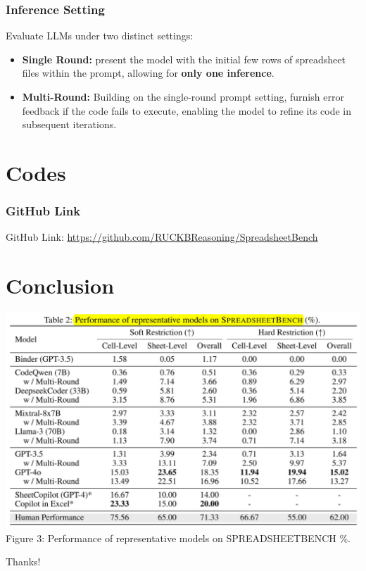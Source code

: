 \documentclass{beamer}
\begin{document}
\begin{frame}
    \frametitle{Inference Setting}
    Evaluate LLMs under two distinct settings:
    \begin{itemize}
        \item \textbf{Single Round:} present the model with the initial few rows of spreadsheet files within the prompt, allowing for \textbf{only one inference}.
        \item \textbf{Multi-Round:} Building on the single-round prompt setting, furnish error feedback if the code fails to execute, enabling the model to refine its code in subsequent iterations.
    \end{itemize}
\end{frame}

\section{Codes}
\begin{frame}
    \frametitle{GitHub Link}
    GitHub Link: \href{https://github.com/RUCKBReasoning/SpreadsheetBench}{https://github.com/RUCKBReasoning/SpreadsheetBench}
\end{frame}

\section{Conclusion}
\begin{frame}
    \centering
    \includegraphics[width=1\linewidth]{pic/performance.jpg}
    \vspace{0.2cm}
    {\footnotesize Figure 3: Performance of representative models on SPREADSHEETBENCH \(\%\).}
\end{frame}

\begin{frame}
    \begin{center}
        {\Huge\calligra Thanks!}
    \end{center}
\end{frame}
\end{document}
